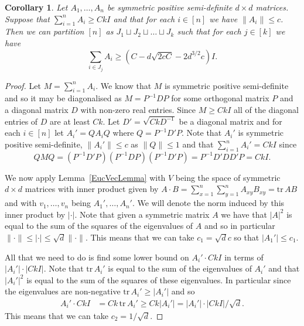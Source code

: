 \documentclass[10pt, english,oneside,reqno]{amsart}
\theoremstyle{plain}
\newtheorem{corollary}[theorem]{Corollary}
\theoremstyle{remark}
\numberwithin{equation}{section}
\numberwithin{figure}{section}
\newcommand{\tr}{\mathrm{tr}}
\begin{document}
\begin{corollary} \label{PartitionMatrixSums}
    Let $A_1, \dots, A_n$ be symmetric positive semi-definite $d \times d$ matrices. Suppose that $\sum_{i=1}^n A_i \geq CkI$ and that for each $i \in [n]$ we have $\| A_i \| \leq c$. Then we can partition $[n]$ as $J_1 \sqcup J_2 \sqcup \dots \sqcup J_k$ such that for each $j \in [k]$ we have $$\sum_{i \in J_j} A_i \geq \left(C - d \sqrt{2 c C} - 2 d^{3/2} c\right) I.$$
\end{corollary}

\begin{proof}
    Let $M = \sum_{i=1}^n A_i$. We know that $M$ is symmetric positive semi-definite and so it may be diagonalised as $M = P^{-1} D P$ for some orthogonal matrix $P$ and a diagonal matrix $D$ with non-zero real entries. Since $M \geq CkI$ all of the diagonal entries of $D$ are at least $Ck$. Let $D' = \sqrt{CkD^{-1}}$ be a diagonal matrix and for each $i \in [n]$ let $A_i' = Q A_i Q$ where $Q = P^{-1} D' P$. Note that $A_i'$ is symmetric positive semi-definite, $\| A_i' \| \leq c$ as $\| Q \| \leq 1$ and that $\sum_{i=1}^n A_i' = CkI$ since $$QMQ = (P^{-1}D'P)(P^{-1}DP)(P^{-1}D'P) = P^{-1}D'DD'P = CkI.$$

    We now apply Lemma~\ref{EucVecLemma} with $V$ being the space of symmetric $d \times d$ matrices with inner product given by $A \cdot B = \sum_{x = 1}^n \sum_{y = 1}^n A_{xy} B_{xy} = \tr \, AB$ and with $v_1, \dots, v_n$ being $A_1', \dots, A_n'$. We will denote the norm induced by this inner product by $|\cdot|$. Note that given a symmetric matrix $A$ we have that $|A|^2$ is equal to the sum of the squares of the eigenvalues of $A$ and so in particular $\|\cdot\| \leq |\cdot| \leq \sqrt{d} \| \cdot \|$. This means that we can take $c_1 = \sqrt{d} c$ so that $|A_1'| \leq c_1$.
    
    All that we need to do is find some lower bound on $A_i' \cdot CkI$ in terms of $| A_i' |\cdot |CkI|$. Note that $\tr \, A_i'$ is equal to the sum of the eigenvalues of $A_i'$ and that $|A_i'|^2$ is equal to the sum of the squares of these eigenvalues. In particular since the eigenvalues are non-negative $\tr \, A_i' \geq | A_i'|$ and so
    \begin{align*}
        A_i' \cdot CkI & = Ck \, \tr \, A_i' \geq Ck |A_i'|
        = |A_i'| \cdot |CkI| / \sqrt{d}.
    \end{align*}
    This means that we can take $c_2 = 1 / \sqrt{d}$.


\end{proof}
\end{document}

